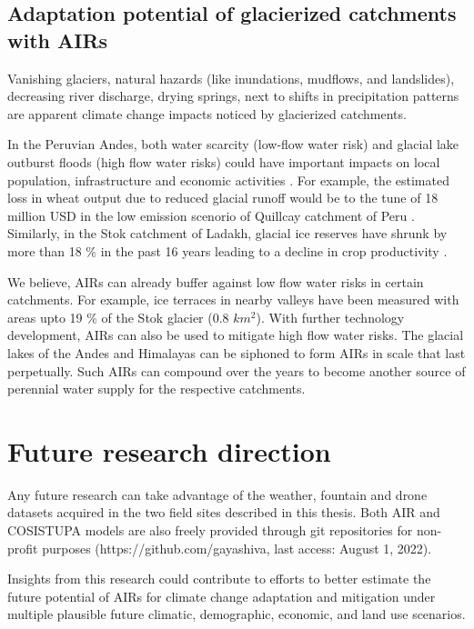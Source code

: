\subsection{Adaptation potential of glacierized catchments with AIRs}

Vanishing glaciers, natural hazards (like inundations, mudflows, and landslides), decreasing river discharge,
drying springs, next to shifts in precipitation patterns are apparent climate change impacts noticed by
glacierized catchments.

In the Peruvian Andes, both water scarcity (low-flow water risk) and glacial lake outburst floods (high flow
water risks) could have important impacts on local population, infrastructure and economic activities
\citep{motschmannIntegratedAssessmentsWater2020}. For example, the estimated loss in wheat output due to reduced
glacial runoff would be to the tune of 18 million USD in the low emission scenorio of Quillcay catchment of Peru
\citep{motschmannCurrentFutureWater2022}. Similarly, in the Stok catchment of Ladakh, glacial ice reserves have
shrunk by more than 18 \% in the past 16 years  leading to a decline in crop productivity
\citep{sohebSpatiotemporalQuantificationKey2022}. 

We believe, AIRs can already buffer against low flow water risks in certain catchments. For example, ice
terraces in nearby valleys have been measured with areas upto 19 \% of the Stok glacier (0.8 $km^2$). With further technology
development, AIRs can also be used to mitigate high flow water risks. The glacial lakes of the Andes and
Himalayas can be siphoned to form AIRs in scale that last perpetually. Such AIRs can compound over the years to
become another source of perennial water supply for the respective catchments.

\section{Future research direction}

Any future research can take advantage of the weather, fountain and drone datasets acquired in the two field
sites described in this thesis. Both AIR and COSISTUPA models are also freely provided through git repositories
for non-profit purposes (https://github.com/gayashiva, last access: August 1, 2022).

Insights from this research could contribute to efforts to better estimate the future potential of AIRs for
climate change adaptation and mitigation under multiple plausible future climatic, demographic, economic, and
land use scenarios. 

